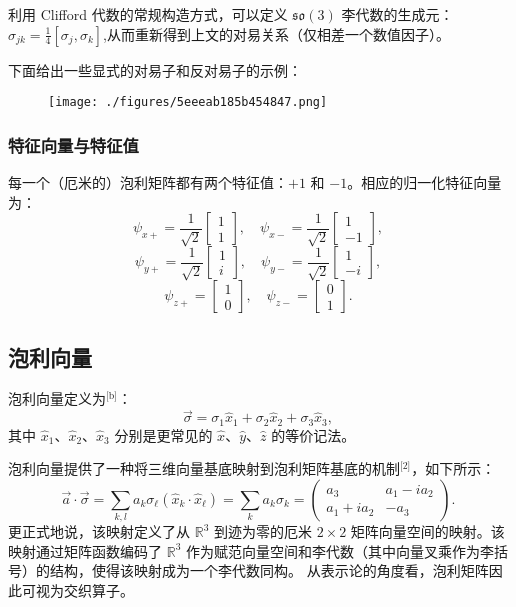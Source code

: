 利用 Clifford 代数的常规构造方式，可以定义 $\mathfrak{so}(3)$ 李代数的生成元：$\sigma_{jk} = \tfrac{1}{4}[\sigma_j, \sigma_k]$,从而重新得到上文的对易关系（仅相差一个数值因子）。

下面给出一些显式的对易子和反对易子的示例：
\begin{figure}[ht]
\centering
\texttt{[image: ./figures/5eeeab185b454847.png]}
\caption{} \label{fig_PLJZ_2}
\end{figure}
\subsubsection{特征向量与特征值}
每一个（厄米的）泡利矩阵都有两个特征值：$+1$ 和 $-1$。相应的归一化特征向量为：
$$
\psi_{x+} = \frac{1}{\sqrt{2}}
\begin{bmatrix}
1\\
1
\end{bmatrix},
\quad
\psi_{x-} = \frac{1}{\sqrt{2}}
\begin{bmatrix}
1\\
-1
\end{bmatrix},~
$$
$$
\psi_{y+} = \frac{1}{\sqrt{2}}
\begin{bmatrix}
1\\
i
\end{bmatrix},
\quad
\psi_{y-} = \frac{1}{\sqrt{2}}
\begin{bmatrix}
1\\
-i
\end{bmatrix},~
$$
$$
\psi_{z+} =
\begin{bmatrix}
1\\
0
\end{bmatrix},
\quad
\psi_{z-} =
\begin{bmatrix}
0\\
1
\end{bmatrix}.~
$$
\subsection{泡利向量}
泡利向量定义为\(^\text{[b]}\)：
$$
\vec{\sigma} = \sigma_1 \hat{x}_1 + \sigma_2 \hat{x}_2 + \sigma_3 \hat{x}_3,~
$$
其中 $\hat{x}_1$、$\hat{x}_2$、$\hat{x}_3$ 分别是更常见的 $\hat{x}$、$\hat{y}$、$\hat{z}$ 的等价记法。

泡利向量提供了一种将三维向量基底映射到泡利矩阵基底的机制\(^\text{[2]}\)，如下所示：
$$
\vec{a} \cdot \vec{\sigma} 
= \sum_{k, l} a_k \sigma_\ell (\hat{x}_k \cdot \hat{x}_\ell) 
= \sum_k a_k \sigma_k
= 
\begin{pmatrix}
a_3 & a_1 - i a_2 \\
a_1 + i a_2 & -a_3
\end{pmatrix}.~
$$
更正式地说，该映射定义了从 $\mathbb{R}^3$ 到迹为零的厄米 $2\times 2$ 矩阵向量空间的映射。该映射通过矩阵函数编码了 $\mathbb{R}^3$ 作为赋范向量空间和李代数（其中向量叉乘作为李括号）的结构，使得该映射成为一个李代数同构。
从表示论的角度看，泡利矩阵因此可视为交织算子。

